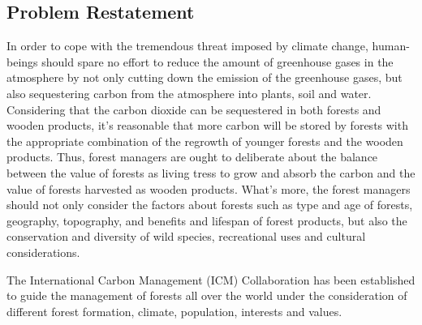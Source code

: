 \documentclass{mcmthesis}
\numberwithin{figure}{section}
\numberwithin{table}{section}
\numberwithin{equation}{section}
\begin{document}
\subsection{Problem Restatement}
In order to cope with the tremendous threat imposed by climate change, human-beings should 
spare no effort to reduce the amount of greenhouse gases in the atmosphere by not only cutting
down the emission of the greenhouse gases, but also sequestering carbon from the atmosphere into
plants, soil and water. Considering that the carbon dioxide can be sequestered in both forests 
and wooden products, it's reasonable that more carbon will be stored by forests with the 
appropriate combination of the regrowth of younger forests and the wooden products.
Thus, forest managers are ought to deliberate about the balance between the value of forests 
as living tress to grow and absorb the carbon and the value of forests harvested as wooden products.
What's more, the forest managers should not only consider the factors about forests such as 
type and age of forests, geography, topography, and benefits and lifespan of forest products,
but also the conservation and diversity of wild species, recreational uses and cultural considerations.
\par
The International Carbon Management (ICM) Collaboration has been established to guide the management
of forests all over the world under the consideration of different forest formation, climate, 
population, interests and values.
\end{document}
